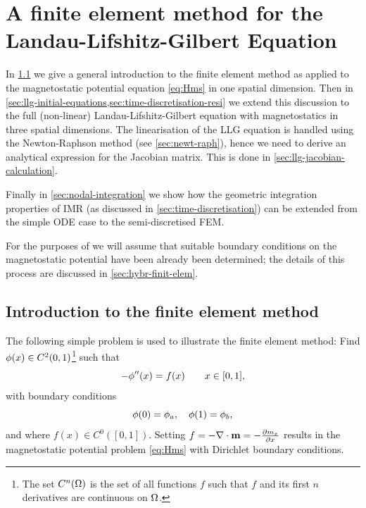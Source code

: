 \chapter{A finite element method for the Landau-Lifshitz-Gilbert Equation}
\label{sec:galerk-meth-llg}

In \cref{sec:intr-finite-ele-diff} we give a general introduction to the finite element method as applied to the magnetostatic potential equation \cref{eq:Hms} in one spatial dimension.
Then in \cref{sec:llg-initial-equations,sec:time-discretisation-resi} we extend this discussion to the full (non-linear) Landau-Lifshitz-Gilbert equation with magnetostatics in three spatial dimensions.
The linearisation of the LLG equation is handled using the Newton-Raphson method (see \cref{sec:newt-raph}), hence we need to derive an analytical expression for the Jacobian matrix.
This is done in \cref{sec:llg-jacobian-calculation}.

Finally in \cref{sec:nodal-integration} we show how the geometric integration properties of IMR (as discussed in \cref{sec:time-discretisation}) can be extended from the simple ODE case to the semi-discretised FEM.

For the purposes of  we will assume that suitable boundary conditions on the magnetostatic potential have been already been determined; the details of this process are discussed in \cref{sec:hybr-finit-elem}.

\section{Introduction to the finite element method}
\label{sec:intr-finite-ele-diff}

The following simple problem is used to illustrate the finite element method:
Find $\phi(x)\in C^{2}(0,1)$\footnote{The set $C^n(\Omega)$ is the set of all functions $f$ such that $f$ and its first $n$ derivatives are continuous on $\Omega$.} such that
\begin{equation}
  -\phi''(x) = f(x) \qquad x \in [0,1],
  \label{eq:poisson1}
\end{equation}
with boundary conditions
\begin{equation}
  \phi(0)=\phi_{a},\quad \phi(1)=\phi_{b},
\end{equation}
and where $f(x)\in C^0([0,1])$.
Setting $f = -\nabla \cdot \boldsymbol{\mathrm{m}} = -\frac{\partial m_x}{\partial x}$ results in the magnetostatic potential problem \cref{eq:Hms} with Dirichlet boundary conditions.

